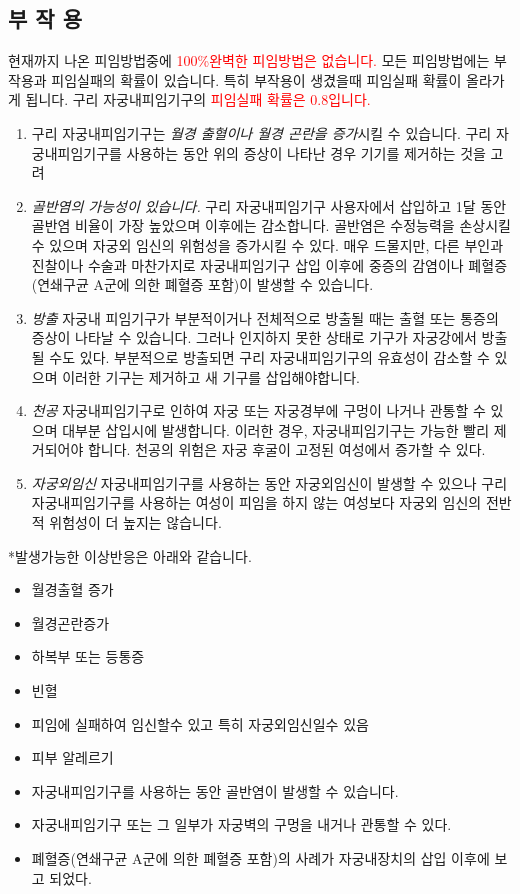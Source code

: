 \subsection*{부 작 용}
현재까지 나온 피임방법중에 \textcolor{red}{100\%완벽한 피임방법은 없습니다.} 모든 피임방법에는 부작용과 피임실패의 확률이 있습니다. 특히 부작용이 생겼을때 피임실패 확률이 올라가게 됩니다. 구리 자궁내피임기구의 \textcolor{red}{피임실패 확률은 0.8입니다.}
\begin{enumerate}\tightlist
\item 구리 자궁내피임기구는\emph{ 월경 출혈이나 월경 곤란을 증가}시킬 수 있습니다.
구리 자궁내피임기구를 사용하는 동안 위의 증상이 나타난 경우 기기를 제거하는 것을 고려
\item \emph{골반염의 가능성이 있습니다.}  구리 자궁내피임기구 사용자에서 삽입하고 1달 동안 골반염 비율이 가장 높았으며 이후에는 감소합니다. 골반염은 수정능력을 손상시킬 수 있으며 자궁외 임신의 위험성을 증가시킬 수 있다. 매우 드물지만, 다른 부인과 진찰이나 수술과 마찬가지로 자궁내피임기구 삽입 이후에 중증의 감염이나 폐혈증(연쇄구균 A군에 의한 폐혈증 포함)이 발생할 수 있습니다.
\item \emph{방출} 자궁내 피임기구가 부분적이거나 전체적으로 방출될 때는 출혈 또는 통증의 증상이 나타날 수 있습니다. 그러나 인지하지 못한 상태로 기구가 자궁강에서 방출될 수도 있다. 부분적으로 방출되면 구리 자궁내피임기구의 유효성이 감소할 수 있으며 이러한 기구는 제거하고 새 기구를 삽입해야합니다.
\item \emph{천공} 자궁내피임기구로 인하여 자궁 또는 자궁경부에 구멍이 나거나 관통할 수 있으며 대부분 삽입시에 발생합니다. 이러한 경우, 자궁내피임기구는 가능한 빨리 제거되어야 합니다. 천공의 위험은 자궁 후굴이 고정된 여성에서 증가할 수 있다.
\item \emph{자궁외임신} 자궁내피임기구를 사용하는 동안 자궁외임신이 발생할 수 있으나 구리 자궁내피임기구를 사용하는 여성이 피임을 하지 않는 여성보다 자궁외 임신의 전반적 위험성이 더 높지는 않습니다.
\end{enumerate}

*발생가능한 이상반응은 아래와 같습니다.
\begin{itemize}\tightlist
\item 월경출혈 증가
\item 월경곤란증가
\item 하복부 또는 등통증
\item 빈혈
\item 피임에 실패하여 임신할수 있고 특히 자궁외임신일수 있음
\item 피부 알레르기
\item 자궁내피임기구를 사용하는 동안 골반염이 발생할 수 있습니다.
\item 자궁내피임기구 또는 그 일부가 자궁벽의 구멍을 내거나 관통할 수 있다.
\item 폐혈증(연쇄구균 A군에 의한 폐혈증 포함)의 사례가 자궁내장치의 삽입 이후에 보고 되었다. 
\end{itemize}

